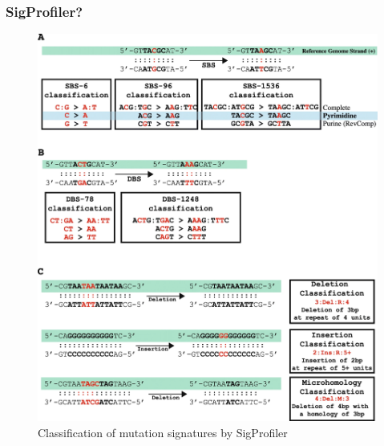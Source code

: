 \documentclass{beamer}
\begin{document}
    \begin{frame}
        \frametitle{SigProfiler?}

        \begin{figure}
            \includegraphics[width=0.4 \linewidth]{figures/Workflow/SigProfiler.jpg}
            \caption{Classification of mutation signatures by SigProfiler \protect\cite{SigProfiler1, SigProfiler2, SigProfiler3}}
        \end{figure}
    \end{frame}
\end{document}
